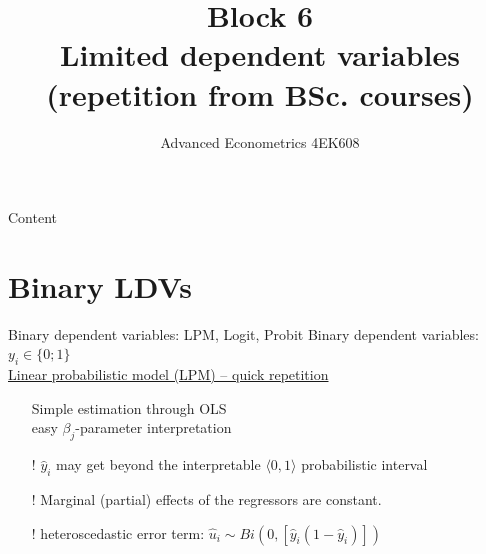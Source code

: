 \documentclass[usenames,dvipsnames]{beamer}
\title[Block 6]{Block 6\\ Limited dependent variables\\(repetition from BSc. courses)}
\author{Advanced Econometrics 4EK608}
\institute{Vysoká škola ekonomická v Praze}
\date{}
\begin{document}
 
\begin{frame}
  \titlepage
\end{frame}

\begin{frame}{Content}
  \tableofcontents
\end{frame}

\section{Binary LDVs}
\begin{frame}{Binary dependent variables: LPM, Logit, Probit}
Binary dependent variables: $y_i \in \{0;1\}$\\
\vspace{1cm}
\underline{Linear probabilistic model (LPM) – quick repetition}\\
\bigskip
\begin{itemize}
\item[\checkmark] Simple estimation through OLS \\ easy $\beta_j$-parameter interpretation\\
\medskip
\item[!] $\hat{y}_i$ may get beyond the interpretable $\langle 0, 1 \rangle$ probabilistic interval\\
\smallskip
\item[!] Marginal (partial) effects of the regressors are constant. \\
\smallskip
\item[!] heteroscedastic error term: $\hat{u}_i \sim Bi (0, [\hat{y}_i (1 - \hat{y}_i)])$
\end{itemize}
\end{frame}
\end{document}

